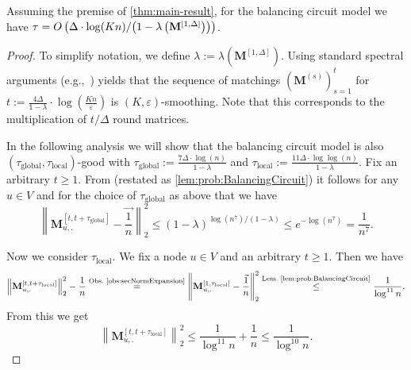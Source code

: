 \documentclass[twoside,leqno]{article}
\newcommand{\M}{\mathbf{M}}
\DeclareMathOperator{\1}{\mathbf{1}}
\newcommand{\taulocal}{\tau_{\mathrm{local}}}
\newcommand{\tauglobal}{\tau_{\mathrm{global}}}
\numberwithin{equation}{section}
\let\epsilon\varepsilon
\begin{document}
\begin{corollary}
\label{cor:BC}
Assuming the premise of \cref{thm:main-result}, for the balancing circuit model we have
$\tau = O\left(\Delta\cdot \log(Kn)/{\left(1-\lambda\left(\vphantom{X^1}\smash{\M^{[1,\Delta]}}\right)\right)}\right)$.
\end{corollary}
\begin{proof}
To simplify notation, we define $\lambda:=\lambda(\M^{[1,\Delta]})$.
    Using standard spectral arguments (e.g.,~\cite[Theorem~1]{DBLP:conf/focs/RabaniSW98}) yields that the sequence of matchings $\left(\M^{(s)}\right)_{s=1}^t$ for
$t:=\frac{4\Delta}{1-\lambda}\cdot \log\left(\frac{Kn}{\epsilon}\right)$
is $(K,\epsilon)$-smoothing. Note that this corresponds to the multiplication of $t/\Delta$ round matrices. 

In the following analysis we will show that the balancing circuit model is also $(\tauglobal,\taulocal)$-good with $\tauglobal:= \frac{7\Delta\cdot \log (n)}{1-\lambda}$ and $\taulocal:=\frac{11\Delta\cdot \log\log (n)}{1-\lambda}$.
 Fix an arbitrary $t\ge 1$.
From \cite[Lemma~2.4]{DBLP:conf/focs/SauerwaldS12} (restated as \cref{lem:prob:BalancingCircuit}) it follows for any $u\in V$ and for the choice of $\tauglobal$ as above that we have
\[
\left\| \M_{u,.}^{[t,t+ \tauglobal]} - \vec{ \frac{1}{n}} \right\|_2^2 \le \left(1-\lambda \right)^{\log (n^7)/(1-\lambda)} \le e^{-\log (n^7)} =\frac{1}{n^7}.
\]


Now we consider $\taulocal$. We fix a node $u\in V$ and an arbitrary $t\ge 1$.
Then we have
\begin{align*}
\left\| \M_{u,.}^{[t,t+\taulocal]}\right\|_2^2 -\frac{1}{n} \stackrel{\text{Obs.~\ref{obs:secNormExpansion}}}{=} \left\| \M_{u,.}^{[1,\taulocal]} - \vec{ \frac{1}{n}} \right\|_2^2 \stackrel{\text{Lem.~\ref{lem:prob:BalancingCircuit}}}{\leq} \frac{1}{\log^{11}n}.
\end{align*}
From this we get
\[
\left\| \M_{u,.}^{[t,t+\taulocal]}\right\|_2^2 \le \frac{1}{\log^{11}n} + \frac{1}{n}\le \frac{1}{\log^{10}n}.
\]
\end{proof}
\end{document}
